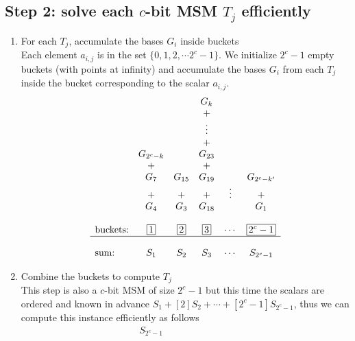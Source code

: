 \documentclass[journal=tches,spthm]{iacrtrans}
\newcommand\Bucket[1]{%
   \tikz[baseline=(char.base)]\node[rectangle,draw,inner sep=2pt] (char) {#1};}
\begin{document}
\subsection{Step 2: solve each $c$-bit MSM $T_j$ efficiently}
\begin{enumerate}
    \item For each $T_j$, accumulate the bases $G_i$ inside buckets \\
        Each element $a_{i,j}$ is in the set $\{0,1,2, \cdots 2^c-1\}$. We initialize $2^c-1$ empty buckets (with points at infinity) and accumulate the bases $G_i$ from each $T_j$ inside the bucket corresponding to the scalar $a_{i,j}$.
        $$\begin{array}{lccccc}
                &  &  & G_k &  &  \\
                &  &  & + &  &  \\
                &  &  & \vdots  & & \\
                &  &  & + &  &  \\
                & G_{2^c-k} &  & G_{23} &  &  \\
                & + &  & + &  &  \\
                & G_7 & G_{15} & G_{19} &  & G_{2^c-k'}  \\
                & + & + & + & \vdots & +  \\
                & G_4 & G_3 & G_{18} &  & G_1  \\
                &&&&& \\
\text{buckets:} & \Bucket{1} & \Bucket{2} & \Bucket{3} & \cdots & \Bucket{$2^c-1$}  \\
                \cline{1-6}
                &&&&& \\
\text{sum:} & S_1 & S_2 & S_3 & \cdots & S_{2^c-1}  \\
        \end{array}$$
    \begin{center}
    \end{center}
    \item Combine the buckets to compute $T_j$\\
        This step is also a $c$-bit MSM of size $2^c-1$ but this time the scalars are ordered and known in advance $S_1+[2]S_2+\cdots+[2^c-1]S_{2^c-1}$, thus we can compute this instance efficiently as follows
        $$\begin{array}{cccccccccccc}
              & S_{2^c-1} &   &  &  &  &  &  &  &  &  &  \\

\end{array}$$
\end{enumerate}
\end{document}
